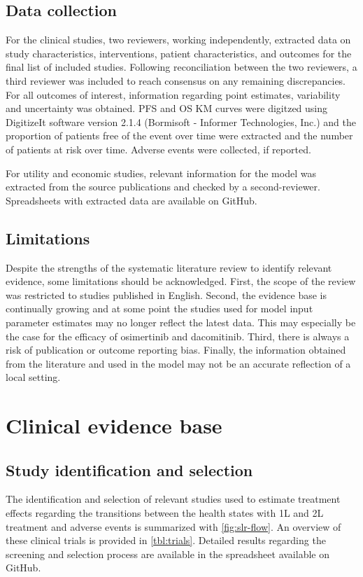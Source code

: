 \documentclass[11pt,final,fleqn]{article}\usepackage[]{graphicx}\usepackage[]{color}
\theoremstyle{plain}
\begin{document}
\begin{appendices}
\subsection{Data collection}
For the clinical studies, two reviewers, working independently, extracted data on study characteristics, interventions, patient characteristics, and outcomes for the final list of included studies. Following reconciliation between the two reviewers, a third reviewer was included to reach consensus on any remaining discrepancies. For all outcomes of interest, information regarding point estimates, variability and uncertainty was obtained. PFS and OS KM curves were digitzed using DigitizeIt software version 2.1.4 (Bormisoft - Informer Technologies, Inc.) and the proportion of patients free of the event over time were extracted and the number of patients at risk over time. Adverse events were collected, if reported. 

For utility and economic studies, relevant information for the model was extracted from the source publications and checked by a second-reviewer. Spreadsheets with extracted data are available on GitHub.

\subsection{Limitations}
Despite the strengths of the systematic literature review to identify relevant evidence, some limitations should be acknowledged. First, the scope of the review was restricted to studies published in English. Second, the evidence base is continually growing and at some point the studies used for model input parameter estimates may no longer reflect the latest data. This may especially be the case for the efficacy of osimertinib and dacomitinib. Third, there is always a risk of publication or outcome reporting bias. Finally, the information obtained from the literature and used in the model may not be an accurate reflection of a local setting.

\section{Clinical evidence base}
\subsection{Study identification and selection} \label{app:study-selection}
The identification and selection of relevant studies used to estimate treatment effects regarding the transitions between the health states with 1L and 2L treatment and adverse events is summarized with \autoref{fig:slr-flow}. An overview of these clinical trials is provided in \autoref{tbl:trials}. Detailed results regarding the screening and selection process are available in the spreadsheet available on GitHub.


\end{appendices}
\end{document}
